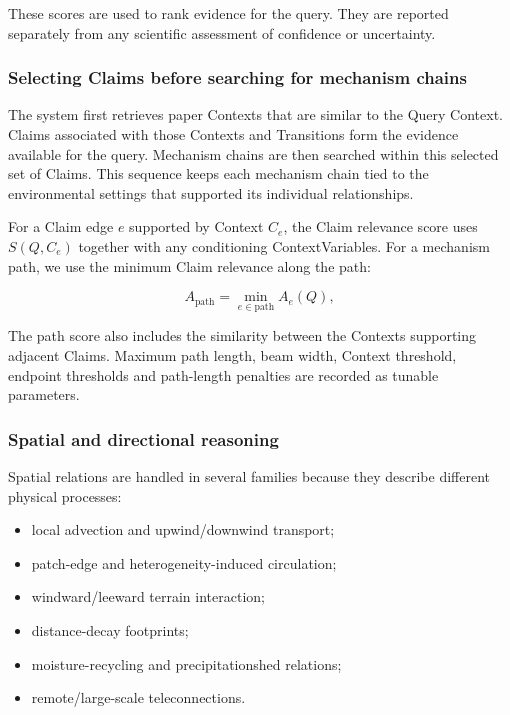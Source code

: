 \documentclass[10pt,twocolumn]{article}
\begin{document}
These scores are used to rank evidence for the query. They are reported separately from any scientific assessment of confidence or uncertainty.

\subsubsection{Selecting Claims before searching for mechanism chains}

The system first retrieves paper Contexts that are similar to the Query Context. Claims associated with those Contexts and Transitions form the evidence available for the query. Mechanism chains are then searched within this selected set of Claims. This sequence keeps each mechanism chain tied to the environmental settings that supported its individual relationships.

For a Claim edge $e$ supported by Context $C_e$, the Claim relevance score uses $S(Q,C_e)$ together with any conditioning ContextVariables. For a mechanism path, we use the minimum Claim relevance along the path:

\begin{equation}
A_{\mathrm{path}} = \min_{e \in \mathrm{path}} A_e(Q),
\end{equation}

The path score also includes the similarity between the Contexts supporting adjacent Claims. Maximum path length, beam width, Context threshold, endpoint thresholds and path-length penalties are recorded as tunable parameters.

\subsubsection{Spatial and directional reasoning}

Spatial relations are handled in several families because they describe different physical processes:

\begin{itemize}
  \item local advection and upwind/downwind transport;
  \item patch-edge and heterogeneity-induced circulation;
  \item windward/leeward terrain interaction;
  \item distance-decay footprints;
  \item moisture-recycling and precipitationshed relations;
  \item remote/large-scale teleconnections.
\end{itemize}
\end{document}
